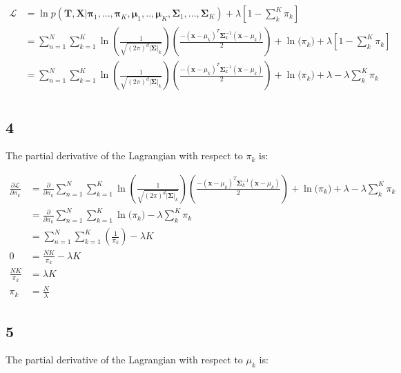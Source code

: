 \documentclass[a4paper]{article}
\begin{document}
\begin{align*}
    \mathcal{L} &= \ln{p(\pmb{T}, \pmb{X}|\pmb{\pi}_{1},...,\pmb{\pi}_{K}, \pmb{\mu}_{1},..,\pmb{\mu}_{K}, \pmb{\Sigma}_1,...,\pmb{\Sigma}_{K})} + \lambda[1 - \sum_{k}^{K} \pi_{k} ]\\
    &= \sum_{n=1}^{N} \sum_{k=1}^{K} \ln{ \left({\frac{1}{\sqrt{(2\pi)^{d}|\pmb{\Sigma}|_{k}}}}\right)
    \left(
    \frac{-(\pmb{x}-\mu_{k})^{T}\pmb{\Sigma}^{-1}_{k}(\pmb{x}-\mu_{k})}{2}
    \right) + \ln{(\pi_{k}})} + \lambda \left[1 - \sum_{k}^{K}\pi_{k} \right]\\
    &= \sum_{n=1}^{N}\sum_{k=1}^{K} \ln{ \left({\frac{1}{\sqrt{(2\pi)^{d}|\pmb{\Sigma}|_{k}}}}\right)
    \left(\frac{-(\pmb{x}-\mu_{k})^{T}\pmb{\Sigma}^{-1}_{k}(\pmb{x}-\mu_{k})}{2}\right) + \ln{(\pi_{k}})} + \lambda - \lambda \sum_{k}^{K} \pi_{k} \\
\end{align*}{}

\subsection*{4}
The partial derivative of the Lagrangian with respect to $\pi_{k}$ is:

\begin{align*}
    \frac{\partial \mathcal{L}}{\partial \pi_{k}} &= \frac{\partial}{\partial \pi_{k}} \sum_{n=1}^{N} \sum_{k=1}^{K} \ln{ \left({\frac{1}{\sqrt{(2\pi)^{d}|\pmb{\Sigma}|_{k}}}}\right)
    \left(\frac{-(\pmb{x}-\mu_{k})^{T}\pmb{\Sigma}^{-1}_{k}(\pmb{x}-\mu_{k})}{2}\right) + \ln{(\pi_{k}})} + \lambda - \lambda \sum_{k}^{K} \pi_{k} \\
    &= \frac{\partial}{\partial \pi_{k}} \sum_{n=1}^{N} \sum_{k=1}^{K}
    \ln{(\pi_{k}}) - \lambda \sum_{k}^{K} \pi_{k} \\
    &= \sum_{n=1}^{N} \sum_{k=1}^{K} (\frac{1}{\pi_{k}}) - \lambda K \\
   0 &= \frac{NK}{\pi_{k}} - \lambda K  \\
   \frac{NK}{\pi_{k}} &= \lambda K  \\
   \pi_{k} &= \frac{N}{\lambda}
\end{align*}{}


\subsection*{5}
The partial derivative of the Lagrangian with respect to $\mu_{k}$ is:
\end{document}
